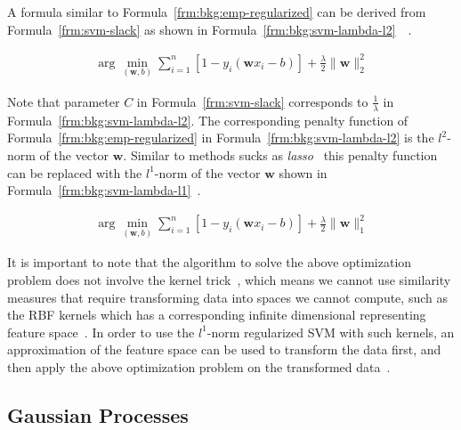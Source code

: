 A formula similar to Formula~\ref{frm:bkg:emp-regularized} can be derived from Formula~\ref{frm:svm-slack} as shown in Formula~\ref{frm:bkg:svm-lambda-l2}~\cite[TODO: Ch.]{statistical-learning}~\cite{hastie2004entire}.

\begin{align}
  \arg\min_{(\mathbf{w},b)}\sum_{i=1}^{n}[1-y_i(\mathbf{w}x_i - b)] + \frac{\lambda}{2}\|\mathbf{w}\|_2^2
  \label{frm:bkg:svm-lambda-l2}
\end{align}

Note that parameter $C$ in Formula~\ref{frm:svm-slack} corresponds to $\frac{1}{\lambda}$ in Formula~\ref{frm:bkg:svm-lambda-l2}. The corresponding penalty function of Formula~\ref{frm:bkg:emp-regularized} in Formula~\ref{frm:bkg:svm-lambda-l2} is the $l^2$-norm of the vector $\mathbf{w}$. Similar to methods sucks as \emph{lasso}~\cite[TODO: Ch.]{statistical-learning} this penalty function can be replaced with the $l^1$-norm of the vector $\mathbf{w}$ shown in Formula~\ref{frm:bkg:svm-lambda-l1}~\cite{zhu20041}.

\begin{align}
  \arg\min_{(\mathbf{w},b)}\sum_{i=1}^{n}[1-y_i(\mathbf{w}x_i - b)] + \frac{\lambda}{2}\|\mathbf{w}\|_1^2
  \label{frm:bkg:svm-lambda-l1}
\end{align}

It is important to note that the algorithm to solve the above optimization problem does not involve the kernel trick~\cite{zhu20041}, which means we cannot use similarity measures that require transforming data into spaces we cannot compute, such as the RBF kernels which has a corresponding infinite dimensional representing feature space~\cite[Ch. 2.3]{learning-with-kernels}. In order to use the $l^1$-norm regularized SVM with such kernels, an approximation of the feature space can be used to transform the data first, and then apply the above optimization problem on the transformed data~\cite{rahimi2007random}.

\subsection{Gaussian Processes}

